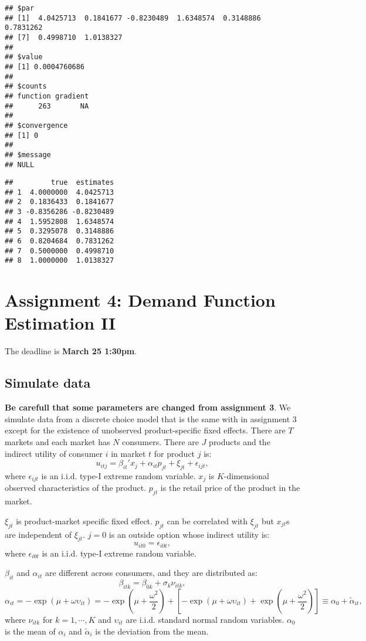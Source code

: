 \documentclass[
]{book}
\begin{document}
\begin{verbatim}
## $par
## [1]  4.0425713  0.1841677 -0.8230489  1.6348574  0.3148886  0.7831262
## [7]  0.4998710  1.0138327
## 
## $value
## [1] 0.0004760686
## 
## $counts
## function gradient 
##      263       NA 
## 
## $convergence
## [1] 0
## 
## $message
## NULL
\end{verbatim}

\begin{verbatim}
##         true  estimates
## 1  4.0000000  4.0425713
## 2  0.1836433  0.1841677
## 3 -0.8356286 -0.8230489
## 4  1.5952808  1.6348574
## 5  0.3295078  0.3148886
## 6  0.8204684  0.7831262
## 7  0.5000000  0.4998710
## 8  1.0000000  1.0138327
\end{verbatim}

\hypertarget{assignment4}{%
\chapter{Assignment 4: Demand Function Estimation II}\label{assignment4}}

The deadline is \textbf{March 25 1:30pm}.

\hypertarget{simulate-data}{%
\section{Simulate data}\label{simulate-data}}

\textbf{Be carefull that some parameters are changed from assignment 3}. We simulate data from a discrete choice model that is the same with in assignment 3 except for the existence of unobserved product-specific fixed effects. There are \(T\) markets and each market has \(N\) consumers. There are \(J\) products and the indirect utility of consumer \(i\) in market \(t\) for product \(j\) is:
\[
u_{itj} = \beta_{it}' x_j + \alpha_{it} p_{jt} + \xi_{jt} + \epsilon_{ijt},
\]
where \(\epsilon_{ijt}\) is an i.i.d. type-I extreme random variable. \(x_j\) is \(K\)-dimensional observed characteristics of the product. \(p_{jt}\) is the retail price of the product in the market.

\(\xi_{jt}\) is product-market specific fixed effect. \(p_{jt}\) can be correlated with \(\xi_{jt}\) but \(x_{jt}\)s are independent of \(\xi_{jt}\). \(j = 0\) is an outside option whose indirect utility is:
\[
u_{it0} = \epsilon_{i0t},
\]
where \(\epsilon_{i0t}\) is an i.i.d. type-I extreme random variable.

\(\beta_{it}\) and \(\alpha_{it}\) are different across consumers, and they are distributed as:
\[
\beta_{itk} = \beta_{0k} + \sigma_k \nu_{itk},
\]
\[
\alpha_{it} = - \exp(\mu + \omega \upsilon_{it}) = - \exp(\mu + \frac{\omega^2}{2}) + [- \exp(\mu + \omega \upsilon_{it}) + \exp(\mu + \frac{\omega^2}{2})] \equiv \alpha_0 + \tilde{\alpha}_{it},
\]
where \(\nu_{itk}\) for \(k = 1, \cdots, K\) and \(\upsilon_{it}\) are i.i.d. standard normal random variables. \(\alpha_0\) is the mean of \(\alpha_i\) and \(\tilde{\alpha}_i\) is the deviation from the mean.
\end{document}
